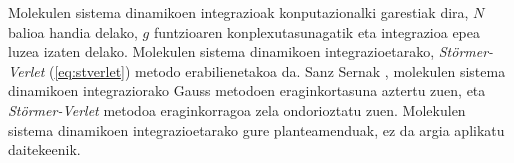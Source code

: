 Molekulen sistema dinamikoen integrazioak konputazionalki garestiak dira, $N$ balioa handia delako, $g$ funtzioaren konplexutasunagatik eta integrazioa epea luzea izaten delako. Molekulen sistema dinamikoen integrazioetarako, \emph{Störmer-Verlet} (\ref{eq:stverlet}) metodo erabilienetakoa da. Sanz Sernak \cite{sserna1996}, molekulen sistema dinamikoen integraziorako Gauss metodoen eraginkortasuna aztertu zuen, eta \emph{Störmer-Verlet} metodoa eraginkorragoa zela ondorioztatu zuen.
Molekulen sistema dinamikoen integrazioetarako gure planteamenduak, ez da argia aplikatu daitekeenik. 



